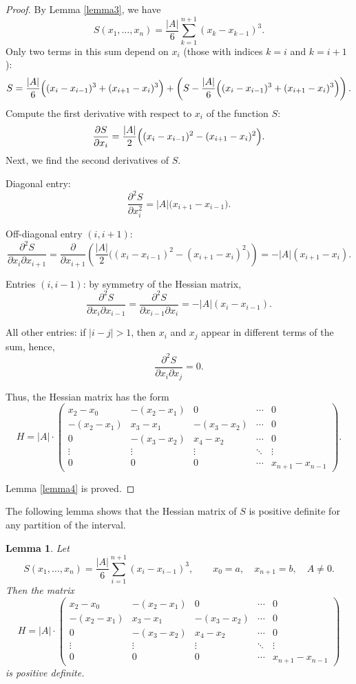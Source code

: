 \documentclass[amstex,16pt, amssymb]{article}
\theoremstyle{plain}
\newtheorem{lemma}{Lemma}[section]
\theoremstyle{definition}
\numberwithin{equation}{section}
\numberwithin{equation}{section}
\begin{document}
\begin{proof}
By Lemma \ref{lemma3}, we have
\[
S(x_1, \dots, x_n) = \frac{|A|}{6} \sum_{k=1}^{n+1} (x_k - x_{k-1})^3.
\]
Only two terms in this sum depend on \( x_i \) (those with indices \( k = i \) and \( k = i+1 \)):
\[
S = \frac{|A|}{6} \Bigl( (x_i - x_{i-1})^3 + (x_{i+1} - x_i)^3 \Bigr) + \left( S-\frac{|A|}{6} \Bigl( (x_i - x_{i-1})^3 + (x_{i+1} - x_i)^3 \Bigr)\right).
\]
Compute the first derivative with respect to $x_i$ of the function $S$:
\[
\frac{\partial S}{\partial x_i}
= \frac{|A|}{2} \Bigl( (x_i - x_{i-1})^2 - (x_{i+1} - x_i)^2 \Bigr).
\]
Next, we find the second derivatives of $S$.

Diagonal entry:
\[
\frac{\partial^2 S}{\partial x_i^2}
= |A| \bigl(  x_{i+1} - x_{i-1}  \bigr).
\]

Off-diagonal entry \( (i, i+1) \):
\[
\frac{\partial^2 S}{\partial x_i \partial x_{i+1}} = \frac{\partial}{\partial x_{i+1}} \left( \frac{|A|}{2} \bigl( (x_i - x_{i-1})^2 - (x_{i+1} - x_i)^2 \bigr) \right)
= -|A| (x_{i+1} - x_i).
\]

Entries \( (i, i-1) \): by symmetry of the Hessian matrix,
\[
\frac{\partial^2 S}{\partial x_i \partial x_{i-1}} = \frac{\partial^2 S}{\partial x_{i-1} \partial x_i} = -|A| (x_i-x_{i-1}).
\]

All other entries: if \( |i - j| > 1 \), then \( x_i \) and \( x_j \) appear in different terms of the sum, hence,
\[
\frac{\partial^2 S}{\partial x_i \partial x_j} = 0.
\]

Thus, the Hessian matrix has the form
\[
H = |A| \cdot
\begin{pmatrix}
x_2 - x_0 & -(x_2 - x_1) & 0 & \cdots & 0 \\
-(x_2 - x_1) & x_3 - x_1 & -(x_3 - x_2) & \cdots & 0 \\
0 & -(x_3 - x_2) & x_4 - x_2 & \cdots & 0 \\
\vdots & \vdots & \vdots & \ddots & \vdots \\
0 & 0 & 0 & \cdots & x_{n+1} - x_{n-1}
\end{pmatrix}.
\]

Lemma \ref{lemma4} is proved. 
\end{proof}

The following lemma shows that the Hessian matrix of \( S \) is positive definite for any partition of the interval.

\begin{lemma}\label{lemma5}
Let
\[
S(x_1, \dots, x_n) = \frac{|A|}{6} \sum_{i=1}^{n+1} (x_i - x_{i-1})^3, \qquad x_0 = a, \quad x_{n+1} = b, \quad A \neq 0.
\]
Then the matrix
\[
H = |A| \cdot
\begin{pmatrix}
x_2 - x_0 & -(x_2 - x_1) & 0 & \cdots & 0 \\
-(x_2 - x_1) & x_3 - x_1 & -(x_3 - x_2) & \cdots & 0 \\
0 & -(x_3 - x_2) & x_4 - x_2 & \cdots & 0 \\
\vdots & \vdots & \vdots & \ddots & \vdots \\
0 & 0 & 0 & \cdots & x_{n+1} - x_{n-1}
\end{pmatrix}
\]
is positive definite.
\end{lemma}
\end{document}
